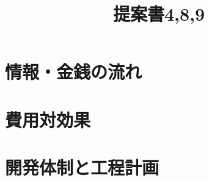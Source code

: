 \documentclass[ a4paper]{ltjsarticle}
\title{提案書4,8,9}
\author{}
\begin{document}
\maketitle

\section{情報・金銭の流れ}


\section{費用対効果}


\section{開発体制と工程計画}

\end{document}
